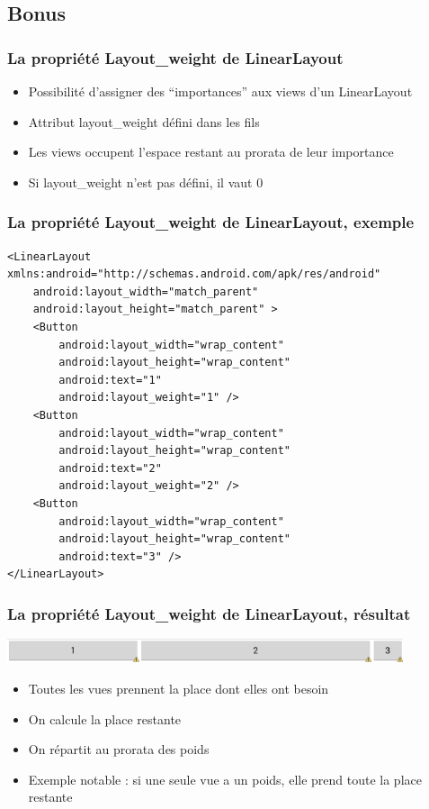 \documentclass{beamer}
\begin{document}
\subsection{Bonus}
\begin{frame}[fragile]
\frametitle{La propriété Layout\_weight de LinearLayout}
\begin{itemize}
  \item Possibilité d'assigner des ``importances'' aux views d'un LinearLayout
  \item Attribut layout\_weight défini dans les fils
  \item Les views occupent l'espace restant au prorata de leur importance
  \item Si layout\_weight n'est pas défini, il vaut 0
\end{itemize}
\end{frame}
\begin{frame}[fragile]
\frametitle{La propriété Layout\_weight de LinearLayout, exemple}
\begin{lstlisting}
<LinearLayout xmlns:android="http://schemas.android.com/apk/res/android"
    android:layout_width="match_parent"
    android:layout_height="match_parent" >
    <Button
        android:layout_width="wrap_content"
        android:layout_height="wrap_content"
        android:text="1"
        android:layout_weight="1" />
    <Button
        android:layout_width="wrap_content"
        android:layout_height="wrap_content"
        android:text="2"
        android:layout_weight="2" />
    <Button
        android:layout_width="wrap_content"
        android:layout_height="wrap_content"
        android:text="3" />
</LinearLayout> 
\end{lstlisting}
\end{frame}
\begin{frame}[fragile]
\frametitle{La propriété Layout\_weight de LinearLayout, résultat}
\includegraphics[width=330pt]{img/weight.png}
\begin{itemize}
  \item Toutes les vues prennent la place dont elles ont besoin
  \item On calcule la place restante
  \item On répartit au prorata des poids
  \item Exemple notable : si une seule vue a un poids, elle prend toute la place
  restante
\end{itemize}
\end{frame}
\end{document}
